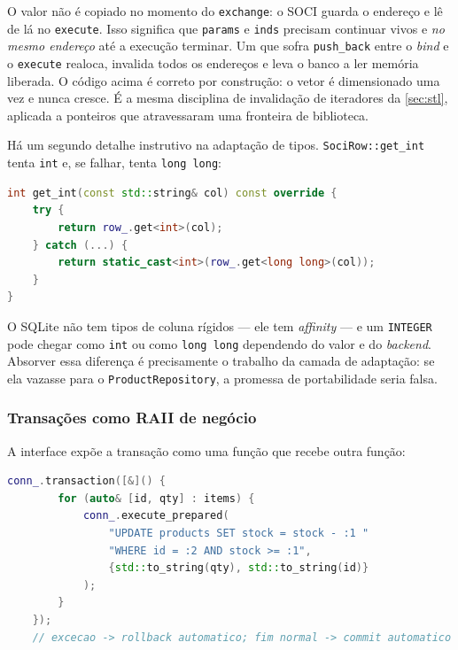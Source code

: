 \begin{armadilha}
O valor não é copiado no momento do \texttt{exchange}: o SOCI guarda o endereço
e lê de lá no \texttt{execute}. Isso significa que \texttt{params} e
\texttt{inds} precisam continuar vivos e \emph{no mesmo endereço} até a
execução terminar. Um  que sofra \texttt{push\_back} entre
o \emph{bind} e o \texttt{execute} realoca, invalida todos os endereços e leva
o banco a ler memória liberada. O código acima é correto por construção: o
vetor é dimensionado uma vez e nunca cresce. É a mesma disciplina de
invalidação de iteradores da \cref{sec:stl}, aplicada a ponteiros que
atravessaram uma fronteira de biblioteca.
\end{armadilha}

Há um segundo detalhe instrutivo na adaptação de tipos. \texttt{SociRow::get\_int}
tenta \texttt{int} e, se falhar, tenta \texttt{long long}:

\begin{lstlisting}[style=bt, language=C++,
    caption={\texttt{src/database/db.cpp}: a mesma coluna tem tipo diferente
             conforme o backend.}]
int get_int(const std::string& col) const override {
    try {
        return row_.get<int>(col);
    } catch (...) {
        return static_cast<int>(row_.get<long long>(col));
    }
}
\end{lstlisting}

O SQLite não tem tipos de coluna rígidos --- ele tem \emph{affinity} --- e um
\texttt{INTEGER} pode chegar como \texttt{int} ou como \texttt{long long}
dependendo do valor e do \emph{backend}. Absorver essa diferença é precisamente
o trabalho da camada de adaptação: se ela vazasse para o
\texttt{ProductRepository}, a promessa de portabilidade seria falsa.

\subsubsection{Transações como RAII de negócio}

A interface expõe a transação como uma função que recebe outra função:

\begin{lstlisting}[style=bt, language=C++,
    caption={\texttt{src/database/main.cpp}: atomicidade sem \emph{commit} nem
             \emph{rollback} escritos à mão pelo chamador.}]
    conn_.transaction([&]() {
        for (auto& [id, qty] : items) {
            conn_.execute_prepared(
                "UPDATE products SET stock = stock - :1 "
                "WHERE id = :2 AND stock >= :1",
                {std::to_string(qty), std::to_string(id)}
            );
        }
    });
    // excecao -> rollback automatico; fim normal -> commit automatico
\end{lstlisting}

